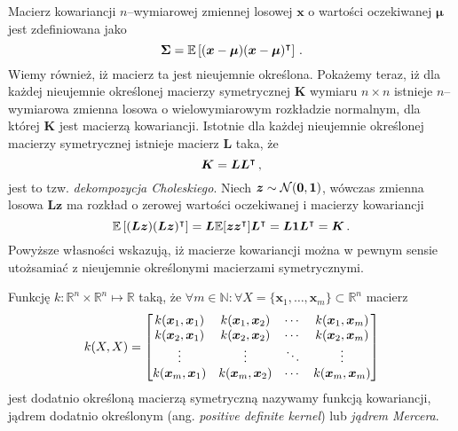 \documentclass{myclass}
\begin{document}
Macierz kowariancji \(n\)--wymiarowej zmiennej losowej \(\bm{x}\) o wartości oczekiwanej
\(\bm{\mu}\) jest zdefiniowana jako
\[
\bm{\Sigma} = \mathbb{E}\left[(\bm{x} - \bm{\mu})(\bm{x} - \bm{\mu})^\intercal\right]\,.
\]
Wiemy również, iż macierz ta jest nieujemnie określona. Pokażemy teraz, iż dla każdej nieujemnie
określonej macierzy symetrycznej \(\bm{K}\) wymiaru \(n\times n\) istnieje \(n\)--wymiarowa zmienna
losowa o wielowymiarowym rozkładzie normalnym, dla której \(\bm{K}\) jest macierzą kowariancji.
Istotnie dla każdej nieujemnie określonej macierzy symetrycznej istnieje macierz \(\bm{L}\) taka, że
\[
\bm{K} = \bm{L}\bm{L}^\intercal\,,
\]
jest to tzw. \emph{dekompozycja Choleskiego}. Niech \(\bm{z} \sim \mathcal{N}(\bm{0}, \bm{1})\), wówczas
zmienna losowa \(\bm{L}\bm{z}\) ma rozkład o zerowej wartości oczekiwanej i macierzy kowariancji
\[
\mathbb{E}\left[(\bm{L}\bm{z})(\bm{L}\bm{z})^\intercal\right] = \bm{L}\mathbb{E}[\bm{z}\bm{z}^\intercal]\bm{L}^\intercal = \bm{L}\bm{1}\bm{L}^\intercal = \bm{K}\,.
\]
Powyższe własności wskazują, iż macierze kowariancji można w pewnym sensie utożsamiać z nieujemnie
określonymi macierzami symetrycznymi.

Funkcję \(k: \mathbb{R}^n\times\mathbb{R}^n\mapsto\mathbb{R}\) taką, że \(\forall m\in\mathbb{N} :
\forall X = \{\bm{x}_1,\ldots,\bm{x}_m\} \subset \mathbb{R}^n\) macierz
\[
k(X,X) = \mqty[k(\bm{x}_1, \bm{x}_1) & k(\bm{x}_1, \bm{x}_2) & \cdots & k(\bm{x}_1, \bm{x}_m)\\
k(\bm{x}_2, \bm{x}_1) & k(\bm{x}_2, \bm{x}_2) & \cdots & k(\bm{x}_2, \bm{x}_m)\\
\vdots & \vdots & \ddots & \vdots\\
k(\bm{x}_m, \bm{x}_1) & k(\bm{x}_m, \bm{x}_2) & \cdots & k(\bm{x}_m, \bm{x}_m)\\]
\]
jest dodatnio określoną macierzą symetryczną nazywamy funkcją kowariancji, jądrem dodatnio
określonym (ang. \emph{positive definite kernel}) lub \emph{jądrem Mercera}.
\end{document}
